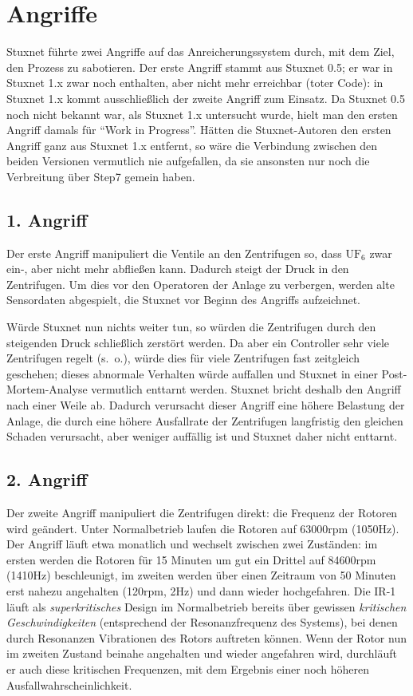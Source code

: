 \documentclass[a4paper]{article}
\begin{document}
\section{Angriffe}

Stuxnet führte zwei Angriffe auf das Anreicherungssystem durch, mit dem Ziel, den Prozess zu sabotieren.
Der erste Angriff stammt aus Stuxnet 0.5;
er war in Stuxnet 1.x zwar noch enthalten, aber nicht mehr erreichbar (toter Code):
in Stuxnet 1.x kommt ausschließlich der zweite Angriff zum Einsatz.
Da Stuxnet 0.5 noch nicht bekannt war, als Stuxnet 1.x untersucht wurde,
hielt man den ersten Angriff damals für ``Work in Progress''.\cite{dossier} %
Hätten die Stuxnet-Autoren den ersten Angriff ganz aus Stuxnet 1.x entfernt,
so wäre die Verbindung zwischen den beiden Versionen vermutlich nie aufgefallen,
da sie ansonsten nur noch die Verbreitung über Step7 gemein haben.\cite{05} %

\subsection{1. Angriff}

Der erste Angriff manipuliert die Ventile an den Zentrifugen so,
dass $\mathrm{UF}_6$ zwar ein-, aber nicht mehr abfließen kann.
Dadurch steigt der Druck in den Zentrifugen.
Um dies vor den Operatoren der Anlage zu verbergen,
werden alte Sensordaten abgespielt, die Stuxnet vor Beginn des Angriffs aufzeichnet.

Würde Stuxnet nun nichts weiter tun, so würden die Zentrifugen durch den steigenden Druck schließlich zerstört werden.
Da aber ein Controller sehr viele Zentrifugen regelt (s.~o.), würde dies für viele Zentrifugen fast zeitgleich geschehen;
dieses abnormale Verhalten würde auffallen und Stuxnet in einer Post-Mortem-Analyse vermutlich enttarnt werden.
Stuxnet bricht deshalb den Angriff nach einer Weile ab.
Dadurch verursacht dieser Angriff eine höhere Belastung der Anlage,
die durch eine höhere Ausfallrate der Zentrifugen langfristig den gleichen Schaden verursacht,
aber weniger auffällig ist und Stuxnet daher nicht enttarnt.

\subsection{2. Angriff}

Der zweite Angriff manipuliert die Zentrifugen direkt: die Frequenz der Rotoren wird geändert.
Unter Normalbetrieb laufen die Rotoren auf 63000rpm (1050Hz).
Der Angriff läuft etwa monatlich und wechselt zwischen zwei Zuständen:
im ersten werden die Rotoren für 15 Minuten um gut ein Drittel auf 84600rpm (1410Hz) beschleunigt,
im zweiten werden über einen Zeitraum von 50 Minuten erst nahezu angehalten (120rpm, 2Hz) und dann wieder hochgefahren.
Die IR-1 läuft als \emph{superkritisches} Design im Normalbetrieb bereits über gewissen \emph{kritischen Geschwindigkeiten}
(entsprechend der Resonanzfrequenz des Systems), bei denen durch Resonanzen Vibrationen des Rotors auftreten können.
Wenn der Rotor nun im zweiten Zustand beinahe angehalten und wieder angefahren wird,
durchläuft er auch diese kritischen Frequenzen, mit dem Ergebnis einer noch höheren Ausfallwahrscheinlichkeit.
\end{document}
